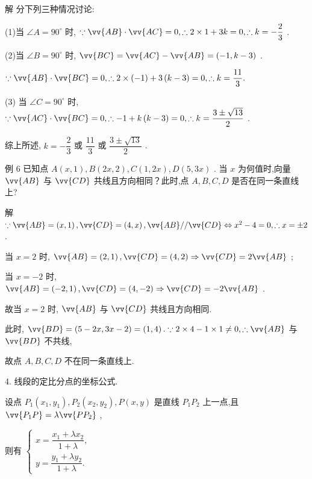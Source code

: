 解 分下列三种情况讨论:

(1)当 $\angle A = {90}^{ \circ  }$ 时, $\because \vv{AB} \cdot  \vv{AC} = 0,\therefore 2 \times  1 + {3k} = 0,\therefore k =  - \dfrac{2}{3}$ .

(2)当 $\angle B = {90}^{ \circ  }$ 时, $\vv{BC} = \vv{AC} - \vv{AB} = \left( {-1,k - 3}\right)$ .

$\because \vv{AB} \cdot  \vv{BC} = 0,\therefore 2 \times  \left( {-1}\right)  + 3\left( {k - 3}\right)  = 0,\therefore k = \dfrac{11}{3}.$

(3) 当 $\angle C = {90}^{ \circ  }$ 时, $\because \vv{AC} \cdot  \vv{BC} = 0,\therefore  - 1 + k\left( {k - 3}\right)  = 0,\therefore k = \dfrac{3 \pm  \sqrt{13}}{2}$ .

综上所述, $k =  - \dfrac{2}{3}$ 或 $\dfrac{11}{3}$ 或 $\dfrac{3 \pm  \sqrt{13}}{2}$ .

例 6 已知点 $A\left( {x,1}\right) ,B\left( {{2x},2}\right) ,C\left( {1,{2x}}\right) ,D\left( {5,{3x}}\right)$ . 当 $x$ 为何值时,向量 $\vv{AB}$ 与 $\vv{CD}$ 共线且方向相同？此时,点 $A,B,C,D$ 是否在同一条直线上?

解 $\because \vv{AB} = \left( {x,1}\right) ,\vv{CD} = \left( {4,x}\right) ,\vv{AB}//\vv{CD} \Leftrightarrow  {x}^{2} - 4 = 0,\therefore x =  \pm  2$ .

当 $x = 2$ 时, $\vv{AB} = \left( {2,1}\right) ,\vv{CD} = \left( {4,2}\right)  \Rightarrow  \vv{CD} = 2\vv{AB}$ ;

当 $x =  - 2$ 时, $\vv{AB} = \left( {-2,1}\right) ,\vv{CD} = \left( {4, - 2}\right)  \Rightarrow  \vv{CD} =  - 2\vv{AB}$ .

故当 $x = 2$ 时, $\vv{AB}$ 与 $\vv{CD}$ 共线且方向相同.

此时, $\vv{BD} = \left( {5 - {2x},{3x} - 2}\right)  = \left( {1,4}\right) .\because 2 \times  4 - 1 \times  1 \neq  0,\therefore \vv{AB}$ 与 $\vv{BD}$ 不共线,

故点 $A,B,C,D$ 不在同一条直线上.

4. 线段的定比分点的坐标公式.

设点 ${P}_{1}\left( {{x}_{1},{y}_{1}}\right) ,{P}_{2}\left( {{x}_{2},{y}_{2}}\right) ,P\left( {x,y}\right)$ 是直线 ${P}_{1}{P}_{2}$ 上一点,且 $\vv{{P}_{1}P} = \lambda \vv{P{P}_{2}}$ ,

则有 $\left\{  \begin{array}{l} x = \dfrac{{x}_{1} + \lambda {x}_{2}}{1 + \lambda }, \\  y = \dfrac{{y}_{1} + \lambda {y}_{2}}{1 + \lambda }. \end{array}\right.$

